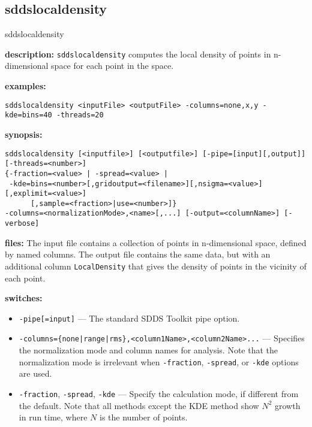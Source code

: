 \newpage
\subsection{sddslocaldensity}
\label{sddslocaldensity}

\begin{sddsprog}{sddslocaldensity}
  \item \textbf{description:}
  \verb|sddslocaldensity| computes the local density of points in n-dimensional space for each point in the space.
  \item \textbf{examples:}
    \begin{verbatim}
sddslocaldensity <inputFile> <outputFile> -columns=none,x,y -kde=bins=40 -threads=20
    \end{verbatim}
  \item \textbf{synopsis:}
    \begin{verbatim}
sddslocaldensity [<inputfile>] [<outputfile>] [-pipe=[input][,output]] [-threads=<number>]
{-fraction=<value> | -spread=<value> |
 -kde=bins=<number>[,gridoutput=<filename>][,nsigma=<value>][,explimit=<value>]
      [,sample=<fraction>|use=<number>]}
-columns=<normalizationMode>,<name>[,...] [-output=<columnName>] [-verbose]
    \end{verbatim}
  \item \textbf{files:}
  The input file contains a collection of points in n-dimensional space, defined by named columns.
  The output file contains the same data, but with an additional column \verb|LocalDensity| that gives
  the density of points in the vicinity of each point.
  \item \textbf{switches:}
    \begin{itemize}
      \item \verb|-pipe[=input]| --- The standard SDDS Toolkit pipe option.
      \item \verb!-columns={none|range|rms},<column1Name>,<column2Name>...! ---
        Specifies the normalization mode and column names for analysis.
        Note that the normalization mode is irrelevant when \verb|-fraction|, \verb|-spread|, or \verb|-kde| options are used.
      \item \verb|-fraction|, \verb|-spread|, \verb|-kde| --- Specify the calculation mode, if different from the default.
        Note that all methods except the KDE method show $N^2$ growth in run time, where $N$ is the number of points.
        \begin{itemize}

\end{itemize}
\end{itemize}
\end{sddsprog}
